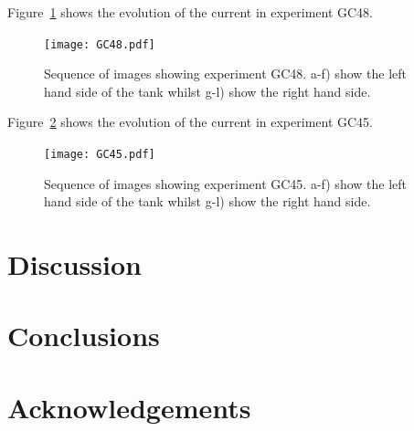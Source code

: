 \documentclass[authoryear,preprint,review,12pt]{elsarticle}
\begin{document}
Figure~\ref{fig:GC48} shows the evolution of the current in experiment GC48.

\begin{figure}[ht!]
  \centerline{\texttt{[image: GC48.pdf]}}
  \caption{Sequence of images showing experiment GC48. a-f) show the left hand side of the tank whilst g-l) show the right hand side.}
  \label{fig:GC48}
\end{figure}

Figure~\ref{fig:GC45} shows the evolution of the current in experiment GC45.

\begin{figure}[ht!]
  \centerline{\texttt{[image: GC45.pdf]}}
  \caption{Sequence of images showing experiment GC45. a-f) show the left hand side of the tank whilst g-l) show the right hand side.}
  \label{fig:GC45}
\end{figure}

\section{Discussion}
\label{sec:dis}

\section{Conclusions}
\label{sec:conc}

\section*{Acknowledgements}
\label{sec:acknow}




%
% 






\end{document}
